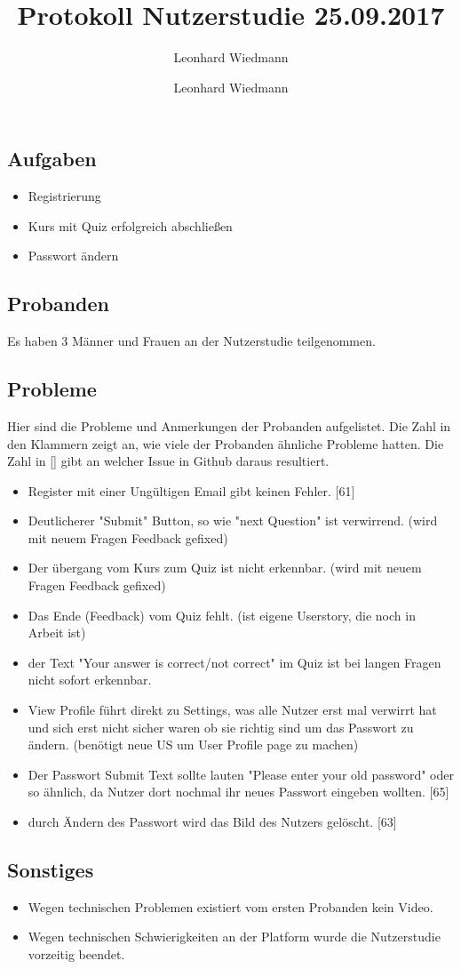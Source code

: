 \documentclass[colorback, accentcolor=tud1c, paper=a4]{tudexercise}
\title{Protokoll Nutzerstudie 25.09.2017}
\subtitle{Leonhard Wiedmann}
\author{Leonhard Wiedmann}
\begin{document}
\maketitle
\subsection*{Aufgaben}
\begin{itemize}
  \item Registrierung
  \item Kurs mit Quiz erfolgreich abschließen
  \item Passwort ändern
\end{itemize}

\subsection*{Probanden}
Es haben 3 Männer und Frauen an der Nutzerstudie teilgenommen.

\subsection*{Probleme}
Hier sind die Probleme und Anmerkungen der Probanden aufgelistet. Die Zahl in den Klammern zeigt an, wie viele der Probanden ähnliche Probleme hatten. Die Zahl in [] gibt an welcher Issue in Github daraus resultiert.
\begin{itemize}
	\item Register mit einer Ungültigen Email gibt keinen Fehler. [61]
	\item Deutlicherer "Submit" Button, so wie "next Question" ist verwirrend. (wird mit neuem Fragen Feedback gefixed)
	\item Der übergang vom Kurs zum Quiz ist nicht erkennbar. (wird mit neuem Fragen Feedback gefixed)
	\item Das Ende (Feedback) vom Quiz fehlt. (ist eigene Userstory, die noch in Arbeit ist)
	\item der Text "Your answer is correct/not correct" im Quiz ist bei langen Fragen nicht sofort erkennbar.
	\item View Profile führt direkt zu Settings, was alle Nutzer erst mal verwirrt hat und sich erst nicht sicher waren ob sie richtig sind um das Passwort zu ändern. (benötigt neue US um User Profile page zu machen)
	\item Der Passwort Submit Text sollte lauten "Please enter your old password" oder so ähnlich, da Nutzer dort nochmal ihr neues Passwort eingeben wollten. [65]
	\item durch Ändern des Passwort wird das Bild des Nutzers gelöscht. [63]
   \end{itemize}

\subsection*{Sonstiges}
\begin{itemize}
	\item Wegen technischen Problemen existiert vom ersten Probanden kein Video.
	\item Wegen technischen Schwierigkeiten an der Platform wurde die Nutzerstudie vorzeitig beendet.
\end{itemize}
\end{document}
